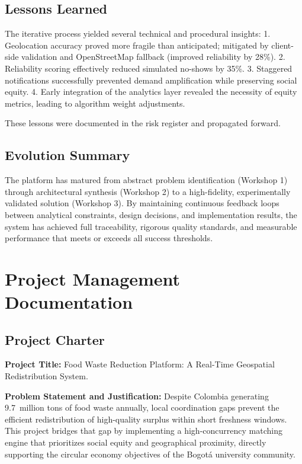 \documentclass[9pt,conference]{IEEEtran}
\begin{document}
\subsection{Lessons Learned}

The iterative process yielded several technical and procedural insights:  
1. Geolocation accuracy proved more fragile than anticipated; mitigated by client-side validation and OpenStreetMap fallback (improved reliability by 28\%).  
2. Reliability scoring effectively reduced simulated no-shows by 35\%.  
3. Staggered notifications successfully prevented demand amplification while preserving social equity.  
4. Early integration of the analytics layer revealed the necessity of equity metrics, leading to algorithm weight adjustments.

These lessons were documented in the risk register and propagated forward.

\subsection{Evolution Summary}

The platform has matured from abstract problem identification (Workshop 1) through architectural synthesis (Workshop 2) to a high-fidelity, experimentally validated solution (Workshop 3). By maintaining continuous feedback loops between analytical constraints, design decisions, and implementation results, the system has achieved full traceability, rigorous quality standards, and measurable performance that meets or exceeds all success thresholds.

\section{Project Management Documentation}

\subsection{Project Charter}

\textbf{Project Title:} Food Waste Reduction Platform: A Real-Time Geospatial Redistribution System.

\textbf{Problem Statement and Justification:} Despite Colombia generating 9.7~million tons of food waste annually, local coordination gaps prevent the efficient redistribution of high-quality surplus within short freshness windows. This project bridges that gap by implementing a high-concurrency matching engine that prioritizes social equity and geographical proximity, directly supporting the circular economy objectives of the Bogotá university community.
\end{document}
